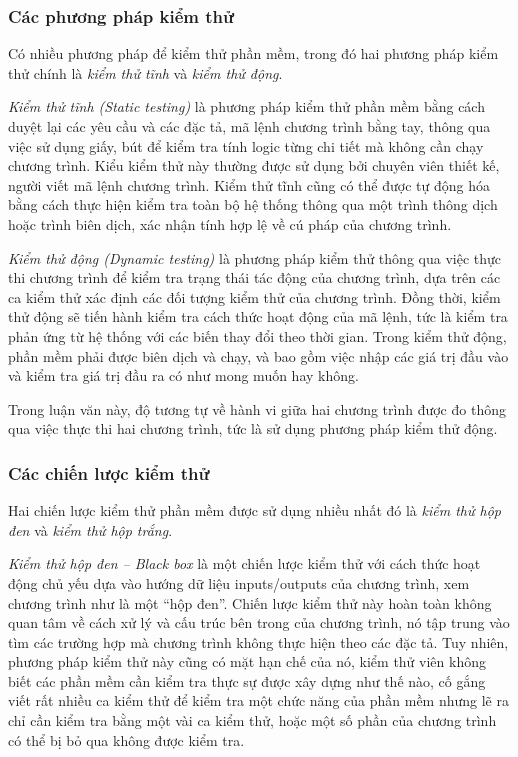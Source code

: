 \subsubsection{Các phương pháp kiểm thử}

Có nhiều phương pháp để kiểm thử phần mềm, trong đó hai phương pháp
kiểm thử chính là \emph{kiểm thử tĩnh} và \emph{kiểm thử động}.

\emph{Kiểm thử tĩnh (Static testing)} là phương pháp kiểm thử phần mềm
bằng cách duyệt lại các yêu cầu và các đặc tả, mã lệnh chương trình
bằng tay, thông qua việc sử dụng giấy, bút để kiểm tra tính logic từng
chi tiết mà không cần chạy chương trình. Kiểu kiểm thử này thường được
sử dụng bởi chuyên viên thiết kế, người viết mã lệnh chương
trình. Kiểm thử tĩnh cũng có thể được tự động hóa bằng cách thực hiện
kiểm tra toàn bộ hệ thống thông qua một trình thông dịch hoặc trình
biên dịch, xác nhận tính hợp lệ về cú pháp của chương trình.
		
\emph{Kiểm thử động (Dynamic testing)} là phương pháp kiểm thử thông
qua việc thực thi chương trình để kiểm tra trạng thái tác động của
chương trình, dựa trên các ca kiểm thử xác định các đối tượng kiểm thử
của chương trình. Đồng thời, kiểm thử động sẽ tiến hành kiểm tra cách
thức hoạt động của mã lệnh, tức là kiểm tra phản ứng từ hệ thống với
các biến thay đổi theo thời gian. Trong kiểm thử động, phần mềm phải
được biên dịch và chạy, và bao gồm việc nhập các giá trị đầu vào và
kiểm tra giá trị đầu ra có như mong muốn hay không.

Trong luận văn này, độ tương tự về hành vi giữa hai chương trình được
đo thông qua việc thực thi hai chương trình, tức là sử dụng phương
pháp kiểm thử động.
	
\subsubsection{Các chiến lược kiểm thử}

Hai chiến lược kiểm thử phần mềm được sử dụng nhiều nhất đó là \emph{kiểm thử hộp đen} và \emph{kiểm thử hộp trắng}.
	
\emph{Kiểm thử hộp đen – Black box} là một chiến lược kiểm thử với
cách thức hoạt động chủ yếu dựa vào hướng dữ liệu inputs/outputs của
chương trình, xem chương trình như là một ``hộp đen''. Chiến lược kiểm
thử này hoàn toàn không quan tâm về cách xử lý và cấu trúc bên trong
của chương trình, nó tập trung vào tìm các trường hợp mà chương trình
không thực hiện theo các đặc tả. Tuy nhiên, phương pháp kiểm thử này
cũng có mặt hạn chế của nó, kiểm thử viên không biết các phần mềm cần
kiểm tra thực sự được xây dựng như thế nào, cố gắng viết rất nhiều ca
kiểm thử để kiểm tra một chức năng của phần mềm nhưng lẽ ra chỉ cần
kiểm tra bằng một vài ca kiểm thử, hoặc một số phần của chương trình
có thể bị bỏ qua không được kiểm tra.

